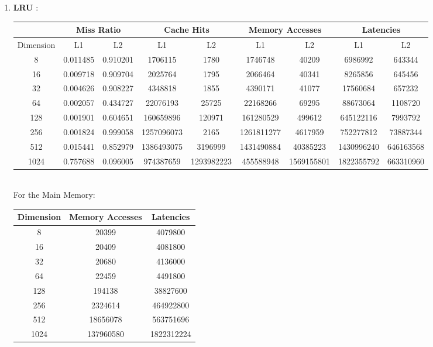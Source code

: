 \documentclass{article}
\begin{document}
\begin{enumerate}
\item \textbf{ LRU }:\\

\begin{tabular}{ |c|c|c|c|c|c|c|c|c| }
\hline
& \multicolumn{2}{|c|}{Miss Ratio} & \multicolumn{2}{|c|}{Cache Hits} & \multicolumn{2}{|c|}{Memory Accesses} & \multicolumn{2}{|c|}{Latencies} \\  \hline
Dimension & L1 & L2 & L1 & L2 & L1 & L2 & L1 & L2 \\  \hline
8  &  0.011485 & 0.910201 &  1706115 & 1780 &  1746748 & 40209 &  6986992 & 643344 \\ \hline
16  &  0.009718 & 0.909704 &  2025764 & 1795 &  2066464 & 40341 &  8265856 & 645456 \\ \hline
32  &  0.004626 & 0.908227 &  4348818 & 1855 &  4390171 & 41077 &  17560684 & 657232 \\ \hline
64  &  0.002057 & 0.434727 &  22076193 & 25725 &  22168266 & 69295 &  88673064 & 1108720 \\ \hline
128  &  0.001901 & 0.604651 &  160659896 & 120971 &  161280529 & 499612 &  645122116 & 7993792 \\ \hline
256  &  0.001824 & 0.999058 &  1257096073 & 2165 &  1261811277 & 4617959 &  752277812 & 73887344 \\ \hline
512  &  0.015441 & 0.852979 &  1386493075 & 3196999 &  1431490884 & 40385223 &  1430996240 & 646163568 \\ \hline
1024  &  0.757688 & 0.096005 &  974387659 & 1293982223 &  455588948 & 1569155801 &  1822355792 & 663310960 \\ \hline
\end{tabular}\\

For the Main Memory:\\

\begin{tabular}{ |c|c|c| }
\hline
Dimension & Memory Accesses & Latencies \\  \hline
8 & 20399 & 4079800 \\ \hline
16 & 20409 & 4081800 \\ \hline
32 & 20680 & 4136000 \\ \hline
64 & 22459 & 4491800 \\ \hline
128 & 194138 & 38827600 \\ \hline
256 & 2324614 & 464922800 \\ \hline
512 & 18656078 & 563751696 \\ \hline
1024 & 137960580 & 1822312224 \\ \hline
\end{tabular}\\\\


\end{enumerate}
\end{document}
